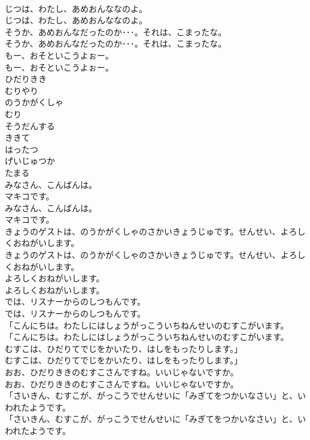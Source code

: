 \documentclass[8pt]{extreport}
\begin{document}
\begin{CJK}{UTF8}{min}
\\	じつは、わたし、あめおんななのよ。
\\	じつは、わたし、あめおんななのよ。
\\	そうか、あめおんなだったのか･･･。それは、こまったな。
\\	そうか、あめおんなだったのか･･･。それは、こまったな。
\\	もー、おそといこうよぉー。
\\	もー、おそといこうよぉー。
\\	ひだりきき
\\	むりやり
\\	のうかがくしゃ
\\	むり
\\	そうだんする
\\	ききて
\\	はったつ
\\	げいじゅつか
\\	たまる
\\	みなさん、こんばんは。
\\	マキコです。
\\	みなさん、こんばんは。
\\	マキコです。
\\	きょうのゲストは、のうかがくしゃのさかいきょうじゅです。せんせい、よろしくおねがいします。
\\	きょうのゲストは、のうかがくしゃのさかいきょうじゅです。せんせい、よろしくおねがいします。
\\	よろしくおねがいします。
\\	よろしくおねがいします。
\\	では、リスナーからのしつもんです。
\\	では、リスナーからのしつもんです。
\\	「こんにちは。わたしにはしょうがっこういちねんせいのむすこがいます。
\\	「こんにちは。わたしにはしょうがっこういちねんせいのむすこがいます。
\\	むすこは、ひだりてでじをかいたり、はしをもったりします。」
\\	むすこは、ひだりてでじをかいたり、はしをもったりします。」
\\	おお、ひだりききのむすこさんですね。いいじゃないですか。
\\	おお、ひだりききのむすこさんですね。いいじゃないですか。
\\	「さいきん、むすこが、がっこうでせんせいに「みぎてをつかいなさい」と、いわれたようです。
\\	「さいきん、むすこが、がっこうでせんせいに「みぎてをつかいなさい」と、いわれたようです。

\end{CJK}
\end{document}
